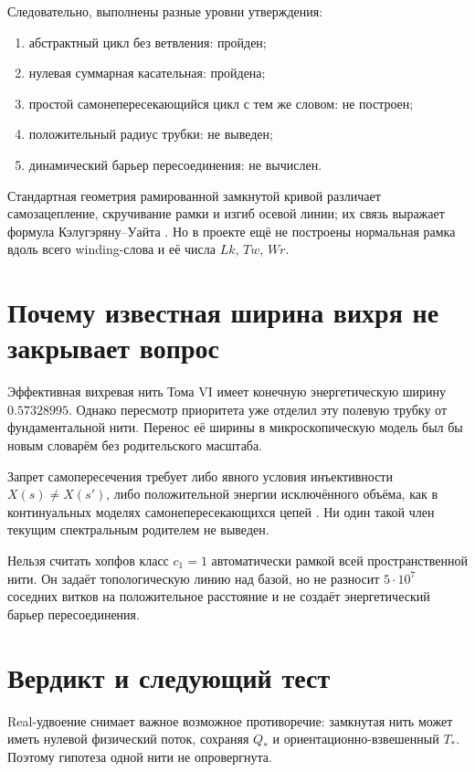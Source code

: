 Следовательно, выполнены разные уровни утверждения:
\begin{enumerate}
 \item абстрактный цикл без ветвления: пройден;
 \item нулевая суммарная касательная: пройдена;
 \item простой самонепересекающийся цикл с тем же словом: не построен;
 \item положительный радиус трубки: не выведен;
 \item динамический барьер пересоединения: не вычислен.
\end{enumerate}

Стандартная геометрия рамированной замкнутой кривой различает
самозацепление, скручивание рамки и изгиб осевой линии; их связь выражает
формула Кэлугэряну--Уайта
\cite{single-thread-white1969,single-thread-dennis-hannay2005}. Но в
проекте ещё не построены нормальная рамка вдоль всего winding-слова и её
числа $Lk$, $Tw$, $Wr$.

\section{Почему известная ширина вихря не закрывает вопрос}

Эффективная вихревая нить Тома VI имеет конечную энергетическую ширину
$0.57328995$. Однако пересмотр приоритета уже отделил эту полевую трубку
от фундаментальной нити. Перенос её ширины в микроскопическую модель был
бы новым словарём без родительского масштаба.

Запрет самопересечения требует либо явного условия инъективности
$X(s)\ne X(s')$, либо положительной энергии исключённого объёма, как в
континуальных моделях самонепересекающихся цепей
\cite{single-thread-edwards1965}. Ни один такой член текущим спектральным
родителем не выведен.

\begin{nogocriterion}
Нельзя считать хопфов класс $c_1=1$ автоматически рамкой всей
пространственной нити. Он задаёт топологическую линию над базой, но не
разносит $5\cdot10^7$ соседних витков на положительное расстояние и не
создаёт энергетический барьер пересоединения.
\end{nogocriterion}

\section{Вердикт и следующий тест}

Real-удвоение снимает важное возможное противоречие: замкнутая нить может
иметь нулевой физический поток, сохраняя $Q_*$ и ориентационно-взвешенный
$T_*$. Поэтому гипотеза одной нити не опровергнута.

